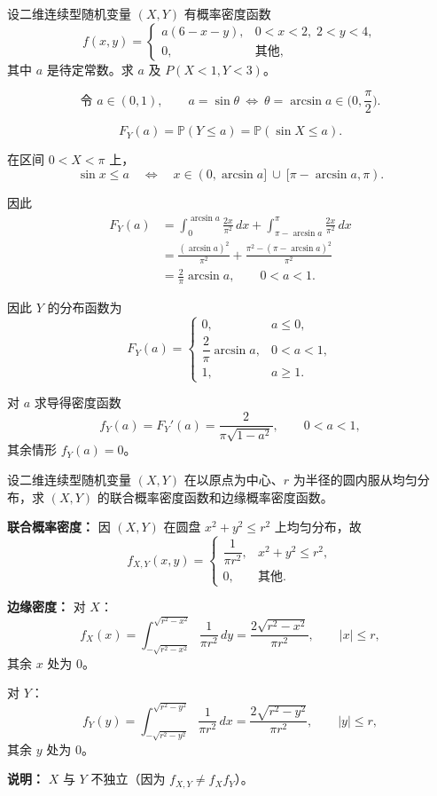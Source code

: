 \begin{homework}[27]
设二维连续型随机变量 $(X,Y)$ 有概率密度函数
\[
f(x,y) =
\begin{cases}
a(6 - x - y), & 0 < x < 2,\; 2 < y < 4, \\[6pt]
0, & \text{其他},
\end{cases}
\]
其中 $a$ 是待定常数。求 $a$ 及 $P(X < 1, Y < 3)$。
\end{homework}
\begin{dxtips}
    \[
\text{令 } a\in(0,1),\qquad a=\sin\theta
\ \Longleftrightarrow\
\theta=\arcsin a\in\Big(0,\frac{\pi}{2}\Big).
\]

\[
F_Y(a)=\mathbb P(Y\le a)=\mathbb P(\sin X\le a).
\]

在区间 $0<X<\pi$ 上，
\[
\sin x\le a
\quad\Longleftrightarrow\quad
x\in(0,\arcsin a]\ \cup\ [\pi-\arcsin a,\pi).
\]

因此
\[
\begin{aligned}
F_Y(a)
&=\int_{0}^{\arcsin a}\frac{2x}{\pi^2}\,dx
+\int_{\pi-\arcsin a}^{\pi}\frac{2x}{\pi^2}\,dx\\[6pt]
&=\frac{(\arcsin a)^2}{\pi^2}
+\frac{\pi^2-(\pi-\arcsin a)^2}{\pi^2}\\[6pt]
&=\frac{2}{\pi}\arcsin a,
\qquad 0<a<1.
\end{aligned}
\]

因此 $Y$ 的分布函数为
\[
F_Y(a)=
\begin{cases}
0, & a\le 0,\\[4pt]
\dfrac{2}{\pi}\arcsin a, & 0<a<1,\\[8pt]
1, & a\ge 1.
\end{cases}
\]

对 $a$ 求导得密度函数
\[
f_Y(a)=F_Y'(a)
=\frac{2}{\pi\sqrt{1-a^2}},
\qquad 0<a<1,
\]
其余情形 $f_Y(a)=0$。
\end{dxtips}
\begin{homework}[28]
设二维连续型随机变量 $(X,Y)$ 在以原点为中心、$r$ 为半径的圆内服从均匀分布，求 $(X,Y)$ 的联合概率密度函数和边缘概率密度函数。
\end{homework}

\begin{solution}
\textbf{联合概率密度：}
因 $(X,Y)$ 在圆盘 $x^2+y^2\le r^2$ 上均匀分布，故
\[
f_{X,Y}(x,y)=
\begin{cases}
\dfrac{1}{\pi r^2}, & x^2+y^2\le r^2,\\[6pt]
0, & \text{其他}.
\end{cases}
\]

\textbf{边缘密度：}
对 $X$：
\[
f_X(x)=\int_{-\sqrt{r^2-x^2}}^{\sqrt{r^2-x^2}} \frac{1}{\pi r^2}\,dy
=\frac{2\sqrt{r^2-x^2}}{\pi r^2},\qquad |x|\le r,
\]
其余 $x$ 处为 $0$。

对 $Y$：
\[
f_Y(y)=\int_{-\sqrt{r^2-y^2}}^{\sqrt{r^2-y^2}} \frac{1}{\pi r^2}\,dx
=\frac{2\sqrt{r^2-y^2}}{\pi r^2},\qquad |y|\le r,
\]
其余 $y$ 处为 $0$。

\textbf{说明：} $X$ 与 $Y$ 不独立（因为 $f_{X,Y}\ne f_X f_Y$）。
\end{solution}

